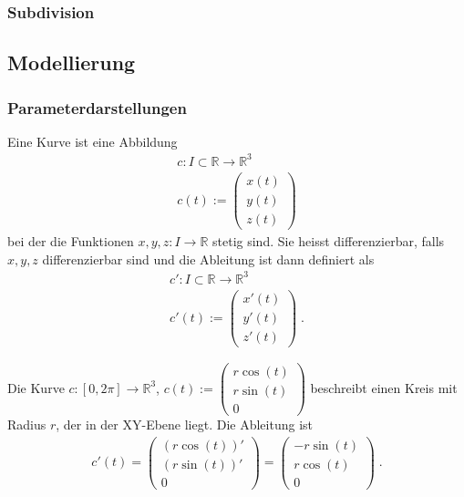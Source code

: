 \subsubsection{Subdivision}



\subsection{Modellierung}

\subsubsection{Parameterdarstellungen}

\begin{Definition}
Eine Kurve ist eine  Abbildung 
\begin{align*}
c: I \subset \mathbb{R} \to \mathbb{R}^3 \\
c(t) := \begin{pmatrix} x(t) \\  y(t) \\ z(t) \end{pmatrix}
\end{align*}
bei der die Funktionen $x, y, z : I \to \mathbb{R}$ stetig sind. Sie heisst differenzierbar, falls $x,y,z$ differenzierbar sind und die Ableitung ist dann definiert als 
\begin{align*}
c': I \subset \mathbb{R} \to \mathbb{R}^3 \\
c'(t) := \begin{pmatrix} x'(t) \\  y'(t) \\ z'(t) \end{pmatrix} \; .
\end{align*}
 \end{Definition}

\begin{Beispiel}
Die Kurve 
$c : [0, 2\pi]  \to  \mathbb{R}^3$, $c(t) :=  \begin{pmatrix} r \cos(t) \\ r  \sin(t) \\  0 \end{pmatrix}$
beschreibt einen Kreis mit Radius $r$, der in der XY-Ebene liegt. Die Ableitung ist
\begin{align*}
c'(t) =  \begin{pmatrix} (r \cos(t))' \\  (r\sin(t))' \\  0 \end{pmatrix} = \begin{pmatrix} -r \sin(t) \\ r \cos(t) \\  0 \end{pmatrix} \;.
\end{align*} 
\end{Beispiel}

